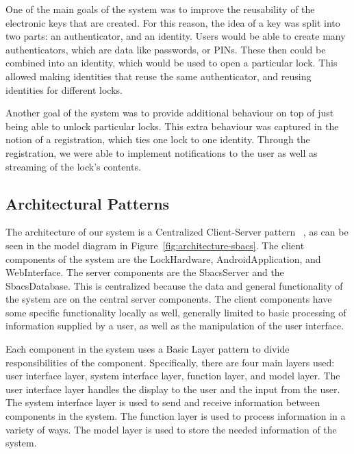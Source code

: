 \documentclass[12pt]{report}
\let\Oldsubsection\subsection
\renewcommand{\subsection}{\FloatBarrier\Oldsubsection}
\begin{document}
One of the main goals of the system was to improve the reusability of the electronic keys that are created. For this
reason, the idea of a key was split into two parts: an authenticator, and an identity. Users would be able to create
many authenticators, which are data like passwords, or PINs. These then could be combined into an identity, which
would be used to open a particular lock. This allowed making identities that reuse the same authenticator, and reusing
identities for different locks.

Another goal of the system was to provide additional behaviour on top of just being able to unlock particular locks.
This extra behaviour was captured in the notion of a registration, which ties one lock to one identity. Through the
registration, we were able to implement notifications to the user as well as streaming of the lock's contents.


\subsection{Architectural Patterns} \label{architectural-patterns}


The architecture of our system is a Centralized Client-Server pattern ~\autocite{CLIENTSERVERARCH}, as can be seen 
in the model diagram in Figure~\ref{fig:architecture-sbacs}. The client components of
the system are the LockHardware, AndroidApplication, and WebInterface. The server components are the SbacsServer and
the SbacsDatabase. This is centralized because the data and general functionality of the system are on the central
server components. The client components have some specific functionality locally as well, generally limited to
basic processing of information supplied by a user, as well as the manipulation of the user interface.

Each component in the system uses a Basic Layer pattern to divide responsibilities of the component. Specifically,
there are four main layers used: user interface layer, system interface layer, function layer, and model layer.
The user interface layer handles the display to the user and the input from the user. The system interface layer
is used to send and receive information between components in the system. The function layer is used to process
information in a variety of ways. The model layer is used to store the needed information of the system.
\end{document}
